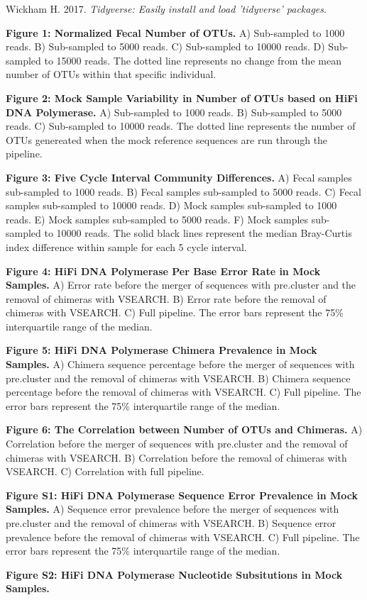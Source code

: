 \documentclass[12pt,]{article}
\begin{document}
\hypertarget{ref-tidyverse_2017}{}
Wickham H. 2017. \emph{Tidyverse: Easily install and load 'tidyverse'
packages}.

\newpage

\textbf{Figure 1: Normalized Fecal Number of OTUs.} A) Sub-sampled to
1000 reads. B) Sub-sampled to 5000 reads. C) Sub-sampled to 10000 reads.
D) Sub-sampled to 15000 reads. The dotted line represents no change from
the mean number of OTUs within that specific individual.

\textbf{Figure 2: Mock Sample Variability in Number of OTUs based on
HiFi DNA Polymerase.} A) Sub-sampled to 1000 reads. B) Sub-sampled to
5000 reads. C) Sub-sampled to 10000 reads. The dotted line represents
the number of OTUs genereated when the mock reference sequences are run
through the pipeline.

\textbf{Figure 3: Five Cycle Interval Community Differences.} A) Fecal
samples sub-sampled to 1000 reads. B) Fecal samples sub-sampled to 5000
reads. C) Fecal samples sub-sampled to 10000 reads. D) Mock samples
sub-sampled to 1000 reads. E) Mock samples sub-sampled to 5000 reads. F)
Mock samples sub-sampled to 10000 reads. The solid black lines represent
the median Bray-Curtis index difference within sample for each 5 cycle
interval.

\textbf{Figure 4: HiFi DNA Polymerase Per Base Error Rate in Mock
Samples.} A) Error rate before the merger of sequences with pre.cluster
and the removal of chimeras with VSEARCH. B) Error rate before the
removal of chimeras with VSEARCH. C) Full pipeline. The error bars
represent the 75\% interquartile range of the median.

\textbf{Figure 5: HiFi DNA Polymerase Chimera Prevalence in Mock
Samples.} A) Chimera sequence percentage before the merger of sequences
with pre.cluster and the removal of chimeras with VSEARCH. B) Chimera
sequence percentage before the removal of chimeras with VSEARCH. C) Full
pipeline. The error bars represent the 75\% interquartile range of the
median.

\textbf{Figure 6: The Correlation between Number of OTUs and Chimeras.}
A) Correlation before the merger of sequences with pre.cluster and the
removal of chimeras with VSEARCH. B) Correlation before the removal of
chimeras with VSEARCH. C) Correlation with full pipeline.

\newpage

\textbf{Figure S1: HiFi DNA Polymerase Sequence Error Prevalence in Mock
Samples.} A) Sequence error prevalence before the merger of sequences
with pre.cluster and the removal of chimeras with VSEARCH. B) Sequence
error prevalence before the removal of chimeras with VSEARCH. C) Full
pipeline. The error bars represent the 75\% interquartile range of the
median.

\textbf{Figure S2: HiFi DNA Polymerase Nucleotide Subsitutions in Mock
Samples.}
\end{document}

